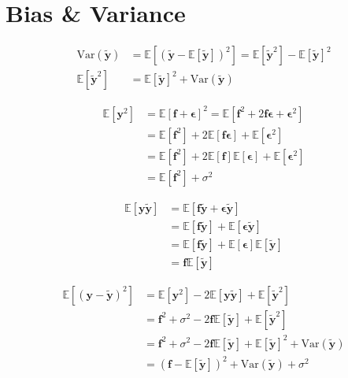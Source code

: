 \documentclass[twoside,11pt]{report}
\begin{document}
\section{Bias \& Variance}

\begin{align*}
    \text{Var}(\boldsymbol{\tilde{y}}) &= \mathbb{E}\left[\left(\tilde{\boldsymbol{y}}-\mathbb{E}\left[\boldsymbol{\tilde{y}}\right]\right)^2\right] = \mathbb{E}[\boldsymbol{\tilde{y}}^2] - \mathbb{E}[\boldsymbol{\tilde{y}}]^2\\
    \mathbb{E}[\boldsymbol{\tilde{y}}^2] &= \mathbb{E}[\boldsymbol{\tilde{y}}]^2 + \text{Var}(\boldsymbol{\tilde{y}})
\end{align*}


\begin{align*}
\mathbb{E}[\boldsymbol{y}^2] & = \mathbb{E}[\boldsymbol{f} + \boldsymbol{\epsilon}]^2 = \mathbb{E}[\boldsymbol{f}^2 + 2\boldsymbol{f}\boldsymbol{\epsilon} + \boldsymbol{\epsilon}^2]\\
& = \mathbb{E}[\boldsymbol{f}^2] + 2\mathbb{E}[\boldsymbol{f}\boldsymbol{\epsilon}] + \mathbb{E}[\boldsymbol{\epsilon}^2]\\
& = \mathbb{E}[\boldsymbol{f}^2] + 2\mathbb{E}[\boldsymbol{f}]\mathbb{E}[\boldsymbol{\epsilon}] + \mathbb{E}[\boldsymbol{\epsilon}^2]\\
& = \mathbb{E}[\boldsymbol{f}^2]  + \sigma^2
\end{align*}


\begin{align*}
\mathbb{E}[\boldsymbol{y\tilde{y}}] & = \mathbb{E}[\boldsymbol{f\tilde{y}} + \boldsymbol{\epsilon\tilde{y}}]\\
& = \mathbb{E}[\boldsymbol{f\tilde{y}}] + \mathbb{E}[\boldsymbol{\epsilon\tilde{y}}]\\
& = \mathbb{E}[\boldsymbol{f\tilde{y}}] + \mathbb{E}[\boldsymbol{\epsilon}]\mathbb{E}[\boldsymbol{\tilde{y}}]\\
& = \boldsymbol{f}\mathbb{E}[\boldsymbol{\tilde{y}}]
\end{align*}


\begin{align*}
\mathbb{E}\left[(\boldsymbol{y}-\boldsymbol{\tilde{y}})^2\right] & = \mathbb{E}[\boldsymbol{y}^2] - 2\mathbb{E}[\boldsymbol{y\tilde{y}}] + \mathbb{E}[\boldsymbol{\tilde{y}}^2]\\
& = \boldsymbol{f}^2 + \sigma^2 - 2\boldsymbol{f}\mathbb{E}[\boldsymbol{\tilde{y}}] + \mathbb{E}[\boldsymbol{\tilde{y}}^2]\\
& = \boldsymbol{f}^2 + \sigma^2 - 2\boldsymbol{f}\mathbb{E}[\boldsymbol{\tilde{y}}] + \mathbb{E}[\boldsymbol{\tilde{y}}]^2 + \text{Var}(\boldsymbol{\tilde{y}})\\
& = (\boldsymbol{f} - \mathbb{E}[\boldsymbol{\tilde{y}}])^2 + \text{Var}(\boldsymbol{\tilde{y}}) + \sigma^2\\
\end{align*}
\end{document}
